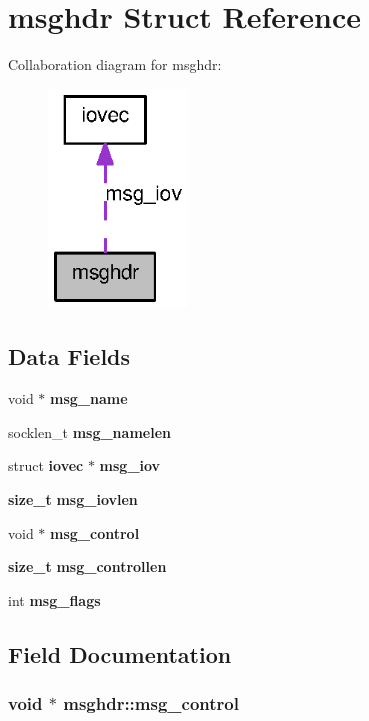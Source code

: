 \section{msghdr Struct Reference}
\label{structmsghdr}


Collaboration diagram for msghdr:
\nopagebreak
\begin{figure}[H]
\begin{center}
\leavevmode
\includegraphics[width=105pt]{structmsghdr__coll__graph}
\end{center}
\end{figure}
\subsection*{Data Fields}
\begin{DoxyCompactItemize}
\item 
void $\ast$ {\bf msg\_\-name}
\item 
socklen\_\-t {\bf msg\_\-namelen}
\item 
struct {\bf iovec} $\ast$ {\bf msg\_\-iov}
\item 
{\bf size\_\-t} {\bf msg\_\-iovlen}
\item 
void $\ast$ {\bf msg\_\-control}
\item 
{\bf size\_\-t} {\bf msg\_\-controllen}
\item 
int {\bf msg\_\-flags}
\end{DoxyCompactItemize}


\subsection{Field Documentation}
\subsubsection[{msg\_\-control}]{\setlength{\rightskip}{0pt plus 5cm}void $\ast$ {\bf msghdr::msg\_\-control}}\label{structmsghdr_a76f934d813f4d250a4e686927d1588ed}
